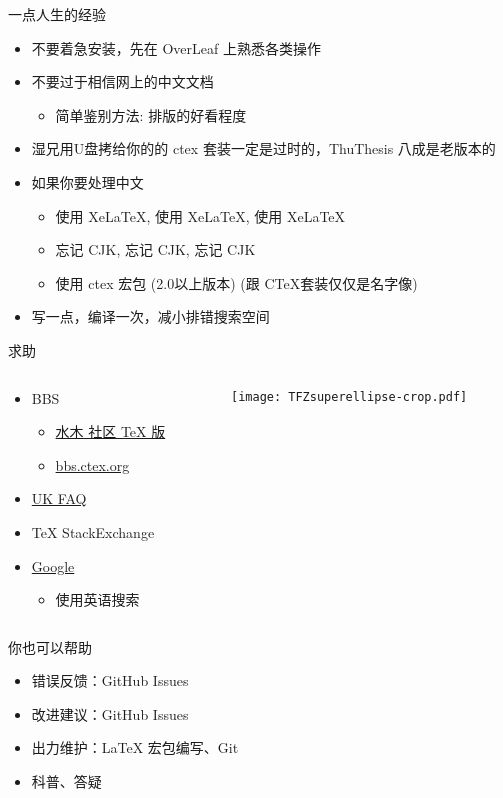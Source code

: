 \begin{frame}{一点人生的经验}
  \begin{itemize}
    \item 不要着急安装，先在 OverLeaf 上熟悉各类操作
    \item 不要过于相信网上的中文文档
      \begin{itemize}
        \item 简单鉴别方法: 排版的好看程度
      \end{itemize}
    \item 湿兄用U盘拷给你的的 ctex 套装一定是过时的，ThuThesis 八成是老版本的
    \item 如果你要处理中文
      \begin{itemize}
        \item 使用 XeLaTeX, 使用 XeLaTeX, 使用 XeLaTeX
        \item 忘记 CJK, 忘记 CJK, 忘记 CJK
        \item 使用 ctex 宏包 (2.0以上版本) (跟 C\TeX 套装仅仅是名字像)
      \end{itemize}
    \item 写一点，编译一次，减小排错搜索空间
  \end{itemize}
\end{frame}

\begin{frame}{求助}
  \begin{columns}[c]
    \begin{column}{.45\textwidth}
      \begin{itemize}
        \item BBS
          \begin{itemize}
            \item \href{http://www.newsmth.net/nForum/board/TeX}{水木
              社区 TeX 版}
            \item \href{http://bbs.ctex.org/}{bbs.ctex.org}
          \end{itemize}
        \item \href{http://www.tex.ac.uk/cgi-bin/texfaq2html}{UK FAQ}
        \item TeX StackExchange
        \item \href{http://justfuckinggoogleit.com/}{Google}
          \begin{itemize}
            \item 使用英语搜索
          \end{itemize}
      \end{itemize}
    \end{column}
    \begin{column}{.45\textwidth}
      \texttt{[image: TFZsuperellipse-crop.pdf]}
    \end{column}
  \end{columns}
\end{frame}

\begin{frame}{你也可以帮助}
  \begin{itemize}
    \item 错误反馈：GitHub Issues
    \item 改进建议：GitHub Issues
    \item 出力维护：LaTeX 宏包编写、Git
    \item 科普、答疑%
  \end{itemize}
\end{frame}

